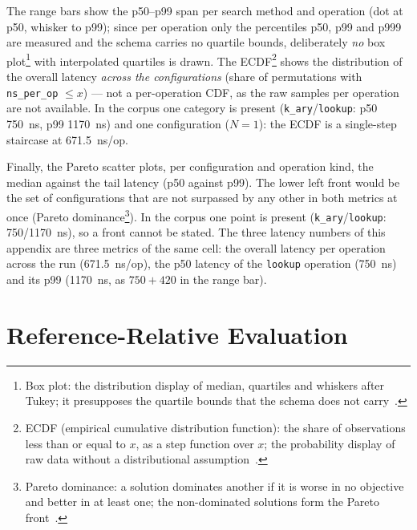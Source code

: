 The range bars show the p50--p99 span per search method and operation (dot at p50, whisker to p99);
since per operation only the percentiles p50, p99 and p999 are measured and the schema carries no
quartile bounds, deliberately \emph{no}
box plot\footnote{Box plot: the distribution display of median, quartiles and whiskers after
Tukey; it presupposes the quartile bounds that the schema does not carry~\cite{mcgill1978boxplots}.}
with interpolated quartiles is drawn. The ECDF\footnote{ECDF (empirical cumulative distribution
function): the share of observations less than or equal to $x$, as a step function over $x$; the
probability display of raw data without a distributional assumption~\cite{wilk1968probability}.}
shows the distribution of the overall latency \emph{across the configurations} (share of
permutations with \texttt{ns\_per\_op} $\le x$) --- not a per-operation CDF, as the raw samples per
operation are not available. In the corpus one category is present (\texttt{k\_ary}/\texttt{lookup}:
p50 750~ns, p99 1170~ns) and one configuration ($N = 1$): the ECDF is a single-step staircase at
671.5~ns/op.


Finally, the Pareto scatter plots, per configuration and operation kind, the median against the
tail latency (p50 against p99). The lower left front would be the set of configurations that are
not surpassed by any other in both metrics at once (Pareto dominance\footnote{Pareto dominance: a
solution dominates another if it is worse in no objective and better in at least one; the
non-dominated solutions form the Pareto
front~\cite{emmerich2018multiobjective,ehrgott2005multicriteria}.}). In the corpus one point is
present (\texttt{k\_ary}/\texttt{lookup}: 750/1170~ns), so a front cannot be stated. The three
latency numbers of this appendix are three metrics of the same cell: the overall latency per
operation across the run (671.5~ns/op), the p50 latency of the \texttt{lookup} operation (750~ns)
and its p99 (1170~ns, as $750 + 420$ in the range bar).


\section{Reference-Relative Evaluation}\label{sec:measurements:reference}


